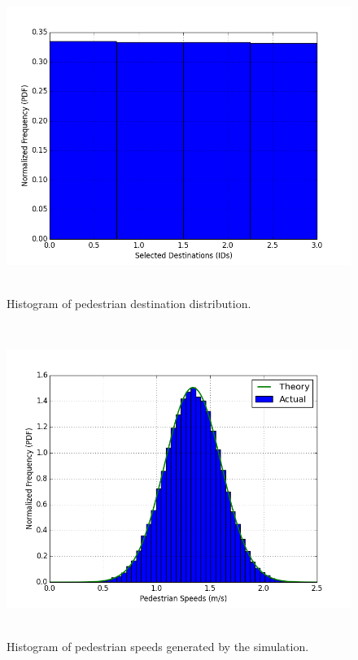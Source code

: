\documentclass[paper=a4, fontsize=11pt]{scrartcl}
\numberwithin{equation}{section}		%
\numberwithin{figure}{section}			%
\numberwithin{table}{section}		    %
\begin{document}
\begin{figure}[H]
	\begin{center}
		\includegraphics[height=4in,width=5.5in]{destination_dist} 
		\caption{Histogram of pedestrian destination distribution.\label{fig:dest_dist}}
	\end{center} 
\end{figure}

\begin{figure}[H]
	\begin{center} 
		\includegraphics[height=4in, width=5.5in]{speed_dist_hist} 
		\caption{Histogram of pedestrian speeds generated by the 
		simulation.\label{fig:speed_dist_sim}}
	\end{center} 
\end{figure}
\end{document}
